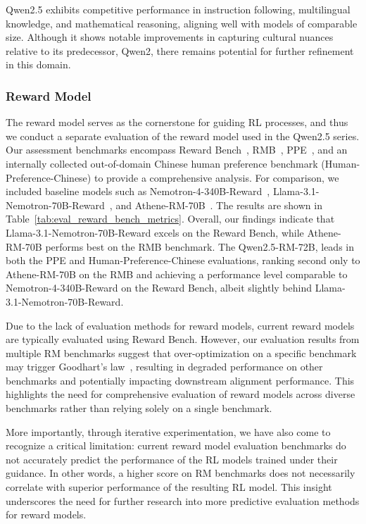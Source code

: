 \documentclass{article}
\begin{document}
Qwen2.5 exhibits competitive performance in instruction following, multilingual knowledge, and mathematical reasoning, aligning well with models of comparable size. Although it shows notable improvements in capturing cultural nuances relative to its predecessor, Qwen2, there remains potential for further refinement in this domain.

\subsubsection{Reward Model}

The reward model serves as the cornerstone for guiding RL processes, and thus we conduct a separate evaluation of the reward model used in the Qwen2.5 series. Our assessment benchmarks encompass Reward Bench~\citep{Lambert2024RewardBenchER}, RMB~\citep{Zhou2024RMBCB}, PPE~\citep{Frick2024HowTE}, and an internally collected out-of-domain Chinese human preference benchmark (Human-Preference-Chinese) to provide a comprehensive analysis.
For comparison, we included baseline models such as Nemotron-4-340B-Reward~\citep{Adler2024Nemotron43T}, Llama-3.1-Nemotron-70B-Reward~\citep{Wang2024HelpSteer2PreferenceCR}, and Athene-RM-70B~\citep{Athene2024}. The results are shown in Table~\ref{tab:eval_reward_bench_metrics}. Overall, our findings indicate that Llama-3.1-Nemotron-70B-Reward excels on the Reward Bench, while Athene-RM-70B performs best on the RMB benchmark. The Qwen2.5-RM-72B, leads in both the PPE and Human-Preference-Chinese evaluations, ranking second only to Athene-RM-70B on the RMB and achieving a performance level comparable to Nemotron-4-340B-Reward on the Reward Bench, albeit slightly behind Llama-3.1-Nemotron-70B-Reward.

Due to the lack of evaluation methods for reward models, current reward models are typically evaluated using Reward Bench. However, our evaluation results from multiple RM benchmarks suggest that over-optimization on a specific benchmark may trigger Goodhart's law~\citep{hoskin1996}, resulting in degraded performance on other benchmarks and potentially impacting downstream alignment performance. This highlights the need for comprehensive evaluation of reward models across diverse benchmarks rather than relying solely on a single benchmark.

More importantly, through iterative experimentation, we have also come to recognize a critical limitation: current reward model evaluation benchmarks do not accurately predict the performance of the RL models trained under their guidance. In other words, a higher score on RM benchmarks does not necessarily correlate with superior performance of the resulting RL model. This insight underscores the need for further research into more predictive evaluation methods for reward models.
\end{document}

